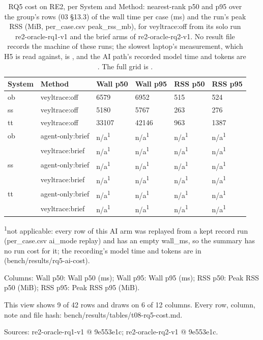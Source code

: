 \begin{table}[t]
\centering
\caption{RQ5 cost on RE2, per System and Method: nearest-rank p50 and p95 over the group's rows (03 \S{}13.3) of the wall time per case (ms) and the run's peak RSS (MiB, per\_case.csv peak\_rss\_mb), for veyltrace:off from its solo run re2-oracle-rq1-v1 and the brief arms of re2-oracle-rq2-v1. No result file records the machine of these runs; the slowest laptop's measurement, which H5 is read against, is , and the AI path's recorded model time and tokens are . The full grid is .}
\label{tab:t08-rq5-cost-paper}
\footnotesize
\setlength{\tabcolsep}{3pt}%
\begin{tabular}{@{}llllll@{}}
\hline
System & Method & Wall p50 & Wall p95 & RSS p50 & RSS p95 \\
\hline
ob & veyltrace:off & 6579 & 6952 & 515 & 524 \\
ss & veyltrace:off & 5180 & 5767 & 263 & 276 \\
tt & veyltrace:off & 33107 & 42146 & 963 & 1387 \\
ob & agent-only:brief & n/a\textsuperscript{1} & n/a\textsuperscript{1} & n/a\textsuperscript{1} & n/a\textsuperscript{1} \\
 & veyltrace:brief & n/a\textsuperscript{1} & n/a\textsuperscript{1} & n/a\textsuperscript{1} & n/a\textsuperscript{1} \\
ss & agent-only:brief & n/a\textsuperscript{1} & n/a\textsuperscript{1} & n/a\textsuperscript{1} & n/a\textsuperscript{1} \\
 & veyltrace:brief & n/a\textsuperscript{1} & n/a\textsuperscript{1} & n/a\textsuperscript{1} & n/a\textsuperscript{1} \\
tt & agent-only:brief & n/a\textsuperscript{1} & n/a\textsuperscript{1} & n/a\textsuperscript{1} & n/a\textsuperscript{1} \\
 & veyltrace:brief & n/a\textsuperscript{1} & n/a\textsuperscript{1} & n/a\textsuperscript{1} & n/a\textsuperscript{1} \\
\hline
\end{tabular}
\par\smallskip\scriptsize\raggedright
\textsuperscript{1}not applicable: every row of this AI arm was replayed from a kept record run (per\_case.csv ai\_mode replay) and has an empty wall\_ms, so the summary has no run cost for it; the recording's model time and tokens are in  (bench/\allowbreak{}results/\allowbreak{}rq5-ai-cost).\par
Columns: Wall p50: Wall p50 (ms); Wall p95: Wall p95 (ms); RSS p50: Peak RSS p50 (MiB); RSS p95: Peak RSS p95 (MiB).\par
This view shows 9 of 42 rows and draws on 6 of 12 columns. Every row, column, note and file hash: bench/\allowbreak{}results/\allowbreak{}tables/\allowbreak{}t08-rq5-cost.md.\par
Sources: re2-oracle-rq1-v1 @ 9e553e1c; re2-oracle-rq2-v1 @ 9e553e1c.\par
\end{table}

